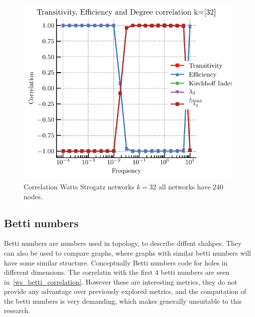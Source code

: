 \documentclass[fleqn,10pt]{wlscirep}
\begin{document}
\begin{figure}[H]
    \includegraphics[width=\linewidth]{fig/Transitiviry_Efficiency_DEgre_correlation_32.pdf} 
    \caption{Correlation Watts Strogatz networks $k=32$ all networks have 240 nodes.}
    \label{ws_correlation_32}
\end{figure}

\subsection{Betti numbers}
Betti numbers are numbers used in topology, to describe diffent shahpes. They can also be used to compare graphs, where graphs with similar betti numbers will have some similar structure. Conceptually Betti numbers code for holes in different dimensions. The correlatin with the first 4 betti numbers are seen in~\ref{ws_betti_correlation}. However these are interesting metrics, they do not provide any advantage over previously explored metrics, and the computation of the betti numbers is very demanding, which makes generally unsuitable to this research.
\end{document}
